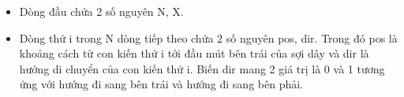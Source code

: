 \begin{itemize}
	\item Dòng đầu chứa 2 số nguyên N, X.
	\item Dòng thứ i trong N dòng tiếp theo chứa 2 số nguyên pos, dir. Trong đó pos là khoảng cách từ con kiến thứ i tới đầu mút bên trái của sợi dây và dir là hướng di chuyển của con kiến thứ i. Biến dir mang 2 giá trị là 0 và 1 tương ứng với hướng đi sang bên trái và hướng đi sang bên phải.
\end{itemize}
